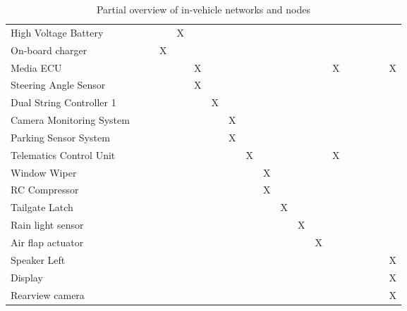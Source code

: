 \begin{table}[htb]
{\begin{tabular}{@{}lllllllllllllllllll@{}}
    High Voltage Battery     &   &   &   & X &   &   &   &   &   &   &   & \multicolumn{1}{c|}{}  &   &   &   &   &   &   \\
    On-board charger         &   &   & X &   &   &   &   &   &   &   &   & \multicolumn{1}{c|}{}  &   &   &   &   &   &   \\
    Media ECU                &   &   &   &   & X &   &   &   &   &   &   & \multicolumn{1}{c|}{}  & X &   &   &   &   & X \\
    Steering Angle Sensor    &   &   &   &   & X &   &   &   &   &   &   & \multicolumn{1}{c|}{}  &   &   &   &   &   &   \\
    Dual String Controller 1 &   &   &   &   &   & X &   &   &   &   &   & \multicolumn{1}{c|}{}  &   &   &   &   &   &   \\
    Camera Monitoring System &   &   &   &   &   &   & X &   &   &   &   & \multicolumn{1}{c|}{}  &   &   &   &   &   &   \\
    Parking Sensor System    &   &   &   &   &   &   & X &   &   &   &   & \multicolumn{1}{c|}{}  &   &   &   &   &   &   \\
    Telematics Control Unit  &   &   &   &   &   &   &   & X &   &   &   & \multicolumn{1}{c|}{}  & X &   &   &   &   &   \\
    Window Wiper             &   &   &   &   &   &   &   &   & X &   &   & \multicolumn{1}{c|}{}  &   &   &   &   &   &   \\
    RC Compressor            &   &   &   &   &   &   &   &   & X &   &   & \multicolumn{1}{c|}{}  &   &   &   &   &   &   \\
    Tailgate Latch           &   &   &   &   &   &   &   &   &   & X &   & \multicolumn{1}{c|}{}  &   &   &   &   &   &   \\
    Rain light sensor        &   &   &   &   &   &   &   &   &   &   & X & \multicolumn{1}{c|}{}  &   &   &   &   &   &   \\
    Air flap actuator        &   &   &   &   &   &   &   &   &   &   &   & \multicolumn{1}{c|}{X} &   &   &   &   &   &   \\
    Speaker Left             &   &   &   &   &   &   &   &   &   &   &   & \multicolumn{1}{c|}{}  &   &   &   &   &   & X \\
    Display                  &   &   &   &   &   &   &   &   &   &   &   & \multicolumn{1}{c|}{}  &   &   &   &   &   & X \\
    Rearview camera          &   &   &   &   &   &   &   &   &   &   &   & \multicolumn{1}{c|}{}  &   &   &   &   &   & X \\
\end{tabular}%
}
\caption{Partial overview of in-vehicle networks and nodes}
\label{tab:networks}
\end{table}

